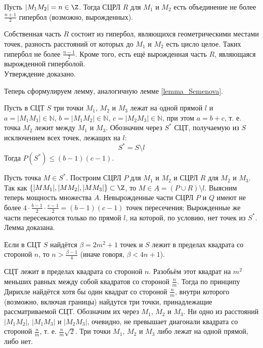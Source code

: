 \begin{utverzhd}
	Пусть $|M_1 M_2|= n \in\Z$.
	Тогда СЦРЛ $R$ для $M_1$ и $M_2$ есть объединение не более $\frac{n+1}{2}$ гипербол (возможно, вырожденных).
\end{utverzhd}

\dokvo
	Собственная часть $R$ состоит из гипербол, являющихся геометрическими местами точек,
	разность расстояний от которых до $M_1$ и $M_2$ есть цисло целое.
	Таких гипербол не более $\frac{n-1}{2}$.
	Кроме того, есть ещё вырожденная часть $R$, являющаяся вырожденной гиперболой.
\\ Утверждение доказано.

Теперь сформулируем лемму, аналогичную лемме \ref{lemma_Semenova}.

\begin{lemma}\label{lemma_3_tochki_na_pryamoj}
	Пусть в СЦТ $S$ три точки $M_1$, $M_2$ и $M_3$ лежат на одной прямой $l$ и 
	$a=|M_1 M_3| \in \mathbb{N}$,
	$b=|M_1 M_2| \in \mathbb{N}$,
	$c=|M_2 M_3| \in \mathbb{N}$,
	при этом $a=b+c$, т. е. точка $M_2$ лежит между $M_1$ и $M_3$.
	Обозначим через $S^*$ СЦТ, получаемую из $S$ исключением всех точек, лежащих на $l$:
	$$
		S^* = S \setminus l
	$$
	Тогда
	$P(S^*) \leq (b-1)(c-1)$.
\end{lemma}

\dokvo
	Пусть точка $M \in S^*$.
	Построим СЦРЛ $P$ для $M_1$ и $M_2$ и СЦРЛ $R$ для $M_2$ и $M_3$.
	Так как $\{|M M_1|,|M M_2|,|M M_3|\}\subset\Z$, то $M\in A = (P \cup R)\setminus l$.
	Выясним теперь мощность множества $A$.
	Невырожденные части СЦРЛ $P$ и $Q$ имеют не более $4\cdot{\frac{b-1}{2}}\cdot{\frac{c-1}{2}}=(b-1)(c-1)$ точек пересечения;
	Вырожденные же части пересекаются только по прямой $l$, на которой, по условию, нет точек из $S^*$.
\\ Лемма доказана.


\begin{lemma}\label{lemma_ocenka_beta}
	Если в СЦТ $S$ найдётся $\beta = 2m^2 +1$ точек
	и $S$ лежит в пределах квадрата со стороной $n$,
	то $n > \frac{\beta - 1}{4}$ (иначе говоря, $ \beta < 4n + 1$).
\end{lemma}

\dokvo
	СЦТ лежит в пределах квадрата со стороной $n$.
	Разобьём этот квадрат на $m^2$ меньших равных между собой квадратов со стороной $\frac{n}{m}$.
	Тогда по принципу Дирихле найдётся хотя бы один квадрат со стороной $\frac{n}{m}$,
	внутри которого (возможно, включая границы) найдутся три точки, принадлежащие рассматриваемой СЦТ.
	Обозначим их через $M_1$, $M_2$ и $M_3$.
	Ни одно из расстояний $|M_1 M_2|$, $|M_1 M_3|$ и $|M_2 M_3|$, очевидно, не превышает диагонали квадрата со стороной $\frac{n}{m}$,
	т. е. $\frac{n}{m}\sqrt{2}$.
	Три точки $M_1$, $M_2$ и $M_3$ либо лежат на одной прямой, либо нет.


